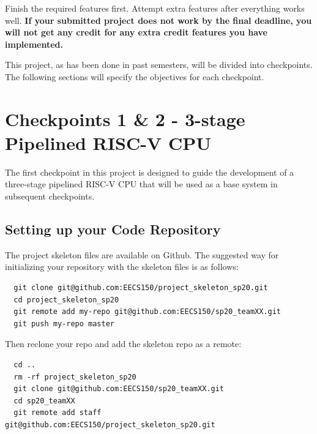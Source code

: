 \documentclass[11pt]{article}
\begin{document}
Finish the required features first.
Attempt extra features after everything works well.
\textbf{If your submitted project does not work by the final deadline, you will not get any credit for any extra credit features you have implemented.}

This project, as has been done in past semesters, will be divided into checkpoints. The following sections will specify the objectives for each checkpoint.

\section{Checkpoints 1 \& 2 - 3-stage Pipelined RISC-V CPU}
The first checkpoint in this project is designed to guide the development of a three-stage pipelined RISC-V CPU that will be used as a base system in subsequent checkpoints.



\subsection{Setting up your Code Repository}
The project skeleton files are available on Github.
The suggested way for initializing your repository with the skeleton files is as follows:

\begin{verbatim}
  git clone git@github.com:EECS150/project_skeleton_sp20.git
  cd project_skeleton_sp20
  git remote add my-repo git@github.com:EECS150/sp20_teamXX.git
  git push my-repo master
\end{verbatim}

Then reclone your repo and add the skeleton repo as a remote:
\begin{verbatim}
  cd ..
  rm -rf project_skeleton_sp20
  git clone git@github.com:EECS150/sp20_teamXX.git
  cd sp20_teamXX
  git remote add staff git@github.com:EECS150/project_skeleton_sp20.git
\end{verbatim}
\end{document}
